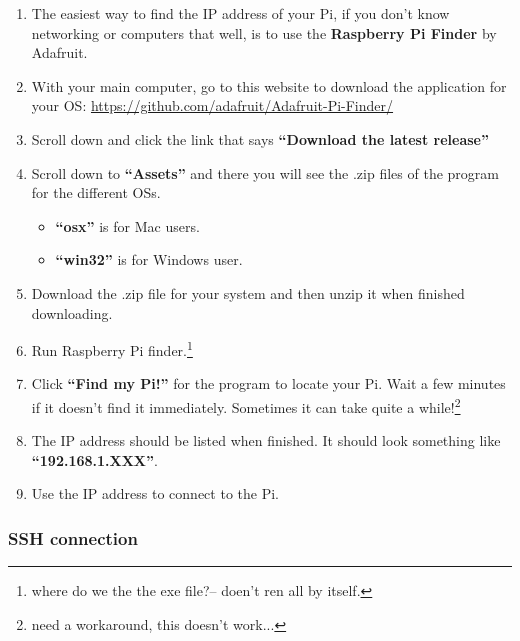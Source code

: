 \documentclass{article}
\begin{document}
\begin{enumerate}
  \item The easiest way to find the IP address of your Pi, if you don't know networking or computers that well, is to use the \textbf{Raspberry Pi Finder} by Adafruit.
  \item With your main computer, go to this website to download the application for your OS: \newline \url{https://github.com/adafruit/Adafruit-Pi-Finder/}
  \item Scroll down and click the link that says \textbf{``Download the latest release''}
  \item Scroll down to \textbf{``Assets''} and there you will see the .zip files of the program for the different OSs.
  \begin{itemize}
    \item \textbf{``osx''} is for Mac users.
    \item \textbf{``win32''} is for Windows user.
  \end{itemize}
  \item Download the .zip file for your system and then unzip it when finished downloading.
  \item Run Raspberry Pi finder.\footnote{where do we the the exe file?-- doen't ren all by itself.}
  \item Click \textbf{``Find my Pi!''} for the program to locate your Pi. Wait a few minutes if it doesn't find it immediately. Sometimes it can take quite a while!\footnote{need a workaround, this doesn't work...}
  \item The IP address should be listed when finished. It should look something like \textbf{``192.168.1.XXX''}. \label{ipaddress}
  \item Use the IP address to connect to the Pi.
\end{enumerate}

\subsubsection{SSH connection}
\label{ssh}
\end{document}
